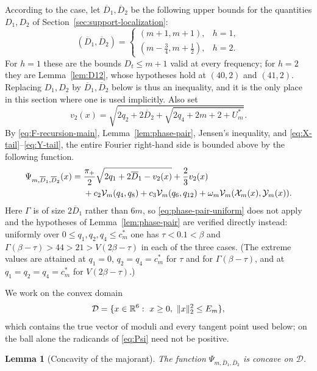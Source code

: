 \documentclass[11pt]{article}
\newtheorem{lemma}[theorem]{Lemma}
\theoremstyle{definition}
\theoremstyle{remark}
\numberwithin{equation}{section}
\newcommand{\R}{\mathbb{R}}
\DeclarePairedDelimiter{\set}{\{}{\}}
\newcommand{\cV}{\mathcal V}
\newcommand{\cX}{\mathcal X}
\newcommand{\cY}{\mathcal Y}
\newcommand{\Db}{\overline D}
\begin{document}
According to the case, let $\Db_1,\Db_2$ be the following upper bounds for the
quantities $D_1,D_2$ of Section~\ref{sec:support-localization}:
\[
  (\Db_1,\Db_2)=
  \begin{cases}
  (m+1,m+1),&h=1,\\
  (m-\frac34,m+\frac12),&h=2.
  \end{cases}
\]
For $h=1$ these are the bounds $D_t\le m+1$ valid at every frequency; for $h=2$
they are Lemma~\ref{lem:D12}, whose hypotheses hold at $(40,2)$ and $(41,2)$.
Replacing $D_1,D_2$ by $\Db_1,\Db_2$ below is thus an inequality, and it is the
only place in this section where one is used implicitly.
Also set
\[
  v_2(x)=
  \sqrt{2q_2+2\Db_2+
  \sqrt{2q_4+2m+2+U_m^*}}.
\]
By \eqref{eq:F-recursion-main}, Lemma~\ref{lem:phase-pair}, Jensen's inequality, and \eqref{eq:X-tail}--\eqref{eq:Y-tail}, the entire Fourier right-hand side is bounded above by the following function.
\begin{align}
 \Psi_{m,\Db_1,\Db_2}(x)={}&
 \frac{\pi_+}{2}\sqrt{2q_1+2\Db_1-v_2(x)}
 +\frac23v_2(x)\notag\\
 &+c_2\cV_m(q_4,q_8)
 +c_3\cV_m(q_6,q_{12})
 +\omega_m\cV_m(\cX_m(x),\cY_m(x)).
 \label{eq:Psi}
\end{align}
Here $\Gamma$ is of size $2\Db_1$ rather than $6m$, so \eqref{eq:phase-pair-uniform} does not apply and the hypotheses of Lemma~\ref{lem:phase-pair} are verified directly instead: uniformly over $0\le q_1,q_2,q_4\le c_m^*$ one has $\tau<0.1<\beta$ and $\Gamma(\beta-\tau)>44>21>V(2\beta-\tau)$ in each of the three cases. (The extreme values are attained at $q_1=0$, $q_2=q_4=c_m^*$ for $\tau$ and for $\Gamma(\beta-\tau)$, and at $q_1=q_2=q_4=c_m^*$ for $V(2\beta-\tau)$.)

We work on the convex domain
\[
  \mathcal D=\set{x\in\R^6:\ x\ge0,\ \|x\|_2^2\le E_m},
\]
which contains the true vector of moduli and every tangent point used below;
on the ball alone the radicands of \eqref{eq:Psi} need not be positive.

\begin{lemma}[Concavity of the majorant]\label{lem:psi-concave}
The function $\Psi_{m,\Db_1,\Db_2}$ is concave on $\mathcal D$.
\end{lemma}
\end{document}
